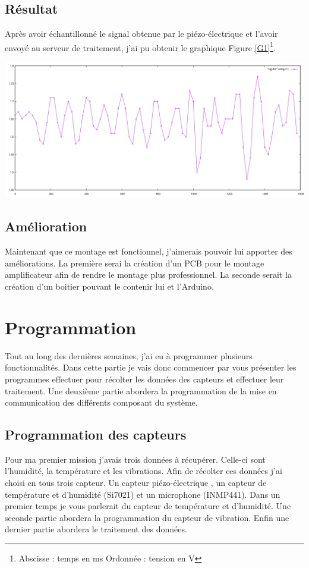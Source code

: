 \documentclass[11pt,french,a4paper]{article}
\begin{document}
\subsection{Résultat}
Après avoir échantillonné le signal obtenue par le piézo-électrique et l'avoir envoyé au serveur de traitement, j'ai pu obtenir le graphique Figure \ref{G1}\footnote{ Abscisse : temps en ms Ordonnée : tension en V }.
\begin{center}
    \includegraphics[scale=0.3]{../img/GRAPH1.png}
    \label{G1}
\end{center}
\subsection{Amélioration}
Maintenant que ce montage est fonctionnel, j'aimerais pouvoir lui apporter des améliorations. La première serai la création d'un PCB pour le montage amplificateur afin de rendre le montage plus professionnel. La seconde serait la création d'un boitier pouvant le contenir lui et l'Arduino. 
\newpage
\section{Programmation}
Tout au long des dernières semaines, j'ai eu à programmer plusieurs fonctionnalités. Dans cette partie je vais donc commencer par vous présenter les programmes effectuer pour récolter les données des capteurs et effectuer leur traitement. Une deuxième partie abordera la programmation de la mise en communication des différents composant du système.
\subsection{Programmation des capteurs}
Pour ma premier mission j'avais trois  données à récupérer. Celle-ci sont l'humidité, la température et les vibrations. Afin de récolter ces données j'ai choisi en tous trois capteur. Un capteur piézo-électrique , un capteur de température et d'humidité (Si7021) et un microphone (INMP441). Dans un premier temps je vous parlerait du capteur de température et d'humidité. Une seconde partie abordera la programmation du capteur de vibration. Enfin une dernier partie abordera le traitement des données.  
\end{document}

